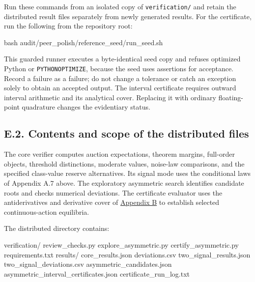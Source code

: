 \documentclass[
  11pt,
]{article}
\newenvironment{Shaded}{}{}
\newcommand{\FunctionTok}[1]{\textcolor[rgb]{0.02,0.16,0.49}{#1}}
\newcommand{\NormalTok}[1]{#1}
\begin{document}
Run these commands from an isolated copy of \texttt{verification/} and
retain the distributed result files separately from newly generated
results. For the certificate, run the following from the repository
root:

\begin{Shaded}
\begin{Highlighting}[]
\FunctionTok{bash}\NormalTok{ audit/peer\_polish/reference\_seed/run\_seed.sh}
\end{Highlighting}
\end{Shaded}

This guarded runner executes a byte-identical seed copy and refuses
optimized Python or \texttt{PYTHONOPTIMIZE}, because the seed uses
assertions for acceptance. Record a failure as a failure; do not change
a tolerance or catch an exception solely to obtain an accepted output.
The interval certificate requires outward interval arithmetic and its
analytical cover. Replacing it with ordinary floating-point quadrature
changes the evidentiary status.

\subsection{E.2. Contents and scope of the distributed
files}\label{oa-e-files}

The core verifier computes auction expectations, theorem margins,
full-order objects, threshold distinctions, moderate values, noise-law
comparisons, and the specified class-value reserve alternatives. Its
signal mode uses the conditional laws of Appendix A.7 above. The exploratory
asymmetric search identifies candidate roots and checks numerical
deviations. The certificate evaluator uses the antiderivatives and
derivative cover of \hyperref[oa-b]{Appendix B} to establish selected
continuous-action equilibria.

The distributed directory contains:

\begin{Shaded}
\begin{Highlighting}[]
\NormalTok{verification/}
\NormalTok{  review\_checks.py}
\NormalTok{  explore\_asymmetric.py}
\NormalTok{  certify\_asymmetric.py}
\NormalTok{  requirements.txt}
\NormalTok{  results/}
\NormalTok{    core\_results.json}
\NormalTok{    deviations.csv}
\NormalTok{    two\_signal\_results.json}
\NormalTok{    two\_signal\_deviations.csv}
\NormalTok{    asymmetric\_candidates.json}
\NormalTok{    asymmetric\_interval\_certificates.json}
\NormalTok{    certificate\_run\_log.txt}
\end{Highlighting}
\end{Shaded}
\end{document}
